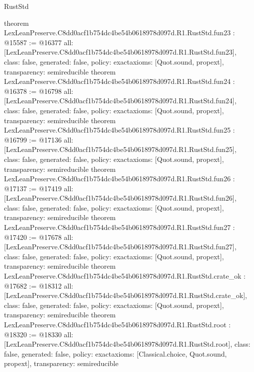\begin{lexlean}{RustStd}
\begin{coremodule}
{}
theorem LexLeanPreserve.C8dd0acf1b754dc4be54b0618978d097d.R1.RustStd.fun23 : @15587 := @16377 {
  all: [LexLeanPreserve.C8dd0acf1b754dc4be54b0618978d097d.R1.RustStd.fun23],
  class: false,
  generated: false,
  policy: exact{axioms: [Quot.sound, propext]},
  transparency: semireducible
}
theorem LexLeanPreserve.C8dd0acf1b754dc4be54b0618978d097d.R1.RustStd.fun24 : @16378 := @16798 {
  all: [LexLeanPreserve.C8dd0acf1b754dc4be54b0618978d097d.R1.RustStd.fun24],
  class: false,
  generated: false,
  policy: exact{axioms: [Quot.sound, propext]},
  transparency: semireducible
}
theorem LexLeanPreserve.C8dd0acf1b754dc4be54b0618978d097d.R1.RustStd.fun25 : @16799 := @17136 {
  all: [LexLeanPreserve.C8dd0acf1b754dc4be54b0618978d097d.R1.RustStd.fun25],
  class: false,
  generated: false,
  policy: exact{axioms: [Quot.sound, propext]},
  transparency: semireducible
}
theorem LexLeanPreserve.C8dd0acf1b754dc4be54b0618978d097d.R1.RustStd.fun26 : @17137 := @17419 {
  all: [LexLeanPreserve.C8dd0acf1b754dc4be54b0618978d097d.R1.RustStd.fun26],
  class: false,
  generated: false,
  policy: exact{axioms: [Quot.sound, propext]},
  transparency: semireducible
}
theorem LexLeanPreserve.C8dd0acf1b754dc4be54b0618978d097d.R1.RustStd.fun27 : @17420 := @17678 {
  all: [LexLeanPreserve.C8dd0acf1b754dc4be54b0618978d097d.R1.RustStd.fun27],
  class: false,
  generated: false,
  policy: exact{axioms: [Quot.sound, propext]},
  transparency: semireducible
}
theorem LexLeanPreserve.C8dd0acf1b754dc4be54b0618978d097d.R1.RustStd.crate_ok : @17682 := @18312 {
  all: [LexLeanPreserve.C8dd0acf1b754dc4be54b0618978d097d.R1.RustStd.crate_ok],
  class: false,
  generated: false,
  policy: exact{axioms: [Quot.sound, propext]},
  transparency: semireducible
}
theorem LexLeanPreserve.C8dd0acf1b754dc4be54b0618978d097d.R1.RustStd.root : @18320 := @18330 {
  all: [LexLeanPreserve.C8dd0acf1b754dc4be54b0618978d097d.R1.RustStd.root],
  class: false,
  generated: false,
  policy: exact{axioms: [Classical.choice, Quot.sound, propext]},
  transparency: semireducible
}


\end{coremodule}
\end{lexlean}
